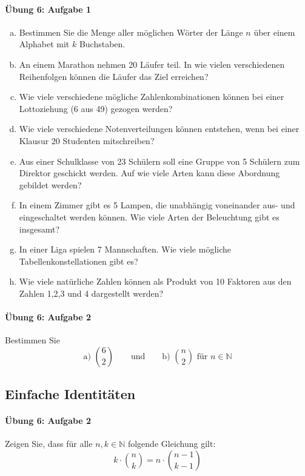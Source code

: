 \documentclass
[
  draft    = true,
  fontsize = 11pt,
  parskip  = half-,
  BCOR     = 0pt,
  DIV      = 11,
  ngerman,
  dvipsnames
]
{scrartcl}
\begin{document}
\paragraph{Übung 6: Aufgabe 1}
\begin{enumerate}[a)]
  \item Bestimmen Sie die Menge aller möglichen Wörter der Länge $n$ über einem Alphabet mit $k$ Buchstaben.
  \item An einem Marathon nehmen 20 Läufer teil. In wie vielen verschiedenen Reihenfolgen können die Läufer das Ziel erreichen?
  \item Wie viele verschiedene mögliche Zahlenkombinationen können bei einer Lottoziehung (6 aus 49) gezogen werden?
  \item Wie viele verschiedene Notenverteilungen können entstehen, wenn bei einer Klausur 20 Studenten mitschreiben?
  \item Aus einer Schulklasse von 23 Schülern soll eine Gruppe von 5 Schülern zum Direktor geschickt werden. Auf wie viele Arten kann diese Abordnung gebildet werden?
  \item In einem Zimmer gibt es 5 Lampen, die unabhängig voneinander aus- und eingeschaltet werden können. Wie viele Arten der Beleuchtung gibt es insgesamt?
  \item In einer Liga spielen 7 Mannschaften. Wie viele mögliche Tabellenkonstellationen gibt es?
  \item Wie viele natürliche Zahlen können als Produkt von 10 Faktoren aus den Zahlen 1,2,3 und 4 dargestellt werden?
\end{enumerate}

\paragraph{Übung 6: Aufgabe 2}
Bestimmen Sie
\begin{equation*}
  \text{a) }\binom{6}{2}
  \qquad
  \text{und}
  \qquad
  \text{b) }\binom{n}{2}\text{ für }n\in\mathbb{N}
\end{equation*}

\subsection{Einfache Identitäten}

\paragraph{Übung 6: Aufgabe 2}
Zeigen Sie, dass für alle $n,k\in\mathbb{N}$ folgende Gleichung gilt:
\begin{equation*}
  k\cdot\binom{n}{k}=n\cdot\binom{n-1}{k-1}
\end{equation*}
\end{document}

